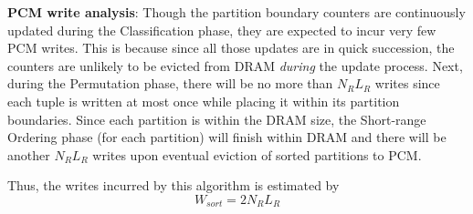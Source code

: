 \textbf{PCM write analysis}: Though the partition boundary counters
are continuously updated during the Classification phase, they are expected to
incur very few PCM writes. This is because since all those updates are
in quick succession, the counters are unlikely to be evicted from DRAM
\emph{during} the update process. Next, during the
Permutation phase, there will be no more than $N_R L_R$ writes since each tuple is written
at most once while placing it within its partition boundaries. Since each
partition is within the DRAM size, the Short-range Ordering phase (for each partition)
will finish within DRAM and there will be another $N_R L_R$ writes upon
eventual eviction of sorted partitions to PCM. 

Thus, the writes incurred by this algorithm is estimated by
\begin{equation}
\label{eq:sort}
  W_{sort} = 2N_RL_R
\end{equation}
